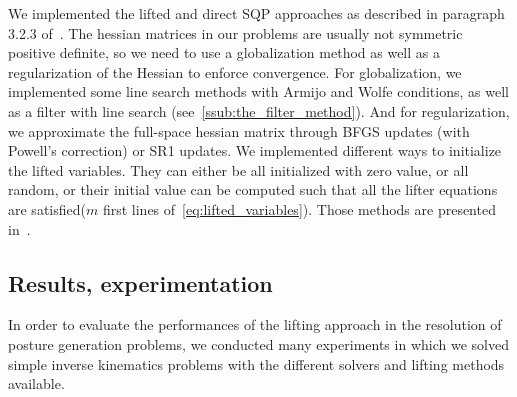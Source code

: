 We implemented the lifted and direct SQP approaches as described in paragraph 3.2.3 of~\cite{Albersmeyer:2010:LNM:1958447.1958472}.
The hessian matrices in our problems are usually not symmetric positive definite, so we need to use a globalization method as well as a regularization of the Hessian to enforce convergence.
For globalization, we implemented some line search methods with Armijo and Wolfe conditions, as well as a filter with line search (see~\ref{ssub:the_filter_method}).
And for regularization, we approximate the full-space hessian matrix through BFGS updates (with Powell's correction) or SR1 updates.
We implemented different ways to initialize the lifted variables.
They can either be all initialized with zero value, or all random, or their initial value can be computed such that all the lifter equations are satisfied($m$ first lines of~\ref{eq:lifted_variables}).
Those methods are presented in~\cite{bonnans:springer:2002}.



\subsection{Results, experimentation}
\label{subsec:Results}

In order to evaluate the performances of the lifting approach in the resolution of posture generation problems, we conducted many experiments in which we solved simple inverse kinematics problems with the different solvers and lifting methods available.

